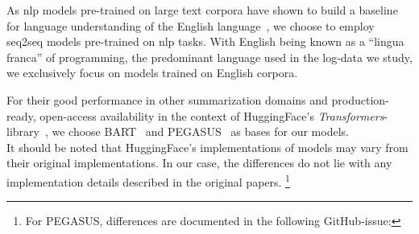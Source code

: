 As \ac{nlp} models pre-trained on large text corpora have shown to build a baseline for language understanding of the English language~\parencites[7876-7878]{bart}[4175-4176]{bert},
we choose to employ \acl{seq2seq} models pre-trained on \ac{nlp} tasks.
With English being known as a \enquote{lingua franca} of programming,
the predominant language used in the log-data we study,
we exclusively focus on models trained on English corpora.

For their good performance in other summarization domains and production-ready,
open-access availability in the context of HuggingFace's \emph{Transformers}-library~\parencite{huggingface_transformers},
we choose BART~\parencite{bart} and PEGASUS~\parencite{pegasus} as bases for our models.\\
It should be noted that HuggingFace's implementations of models may vary from their original implementations.
In our case, the differences do not lie with
any implementation details described in the original papers.%
\footnote{For PEGASUS, differences are documented in the following GitHub-issue:
}

